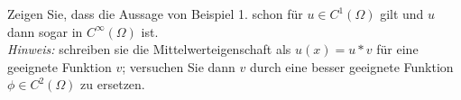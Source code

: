 
\begin{exercise}

Zeigen Sie, dass die Aussage von Beispiel 1. schon für $u \in C^1(\Omega)$ gilt und $u$ dann sogar in $C^\infty(\Omega)$ ist. \\
\textit{Hinweis:}
schreiben sie die Mittelwerteigenschaft als $u(x) = u \ast v$ für eine geeignete Funktion $v$;
versuchen Sie dann $v$ durch eine besser geeignete Funktion $\phi \in C^2(\Omega)$ zu ersetzen.

\end{exercise}


\begin{solution}




\end{solution}
